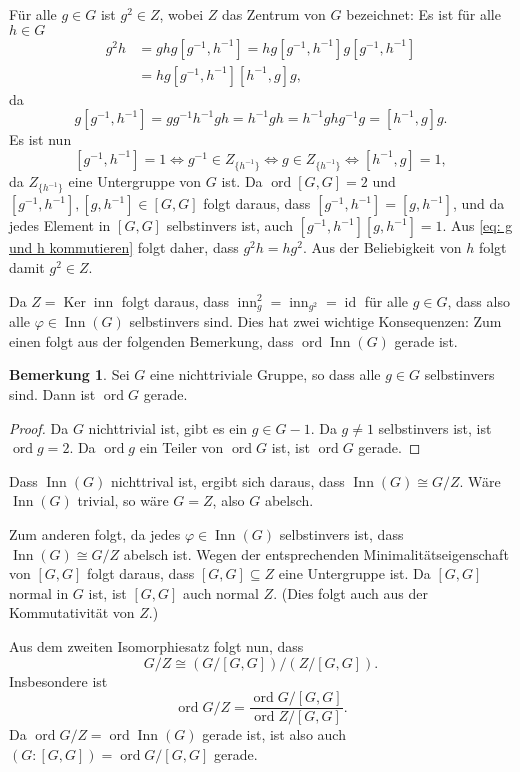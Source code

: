 \documentclass[a4paper,10pt]{article}
\theoremstyle{definition}
\newtheorem{bem}[beh]{Bemerkung}
\newcommand{\id}{\operatorname{id}}
\newcommand{\ord}{\operatorname{ord}}
\newcommand{\inn}{\operatorname{inn}}
\newcommand{\Ker}{\operatorname{Ker}}
\newcommand{\Inn}{\operatorname{Inn}}
\begin{document}
Für alle $g \in G$ ist $g^2 \in Z$, wobei $Z$ das Zentrum von $G$ bezeichnet: Es ist für alle $h \in G$
\begin{equation}\label{eq: g und h kommutieren}
 \begin{aligned}
  g^2 h
  &= g h g \left[g^{-1},h^{-1}\right]
  = h g \left[g^{-1},h^{-1}\right] g \left[g^{-1},h^{-1}\right] \\
  &= h g \left[g^{-1},h^{-1}\right] \left[h^{-1},g\right] g,
 \end{aligned}
\end{equation}
da
\[
 g \left[g^{-1},h^{-1}\right]
 = g g^{-1} h^{-1} g h = h^{-1} g h = h^{-1} g h g^{-1} g = \left[h^{-1},g\right] g.
\]
Es ist nun
\[
 \left[g^{-1},h^{-1}\right] = 1
 \Leftrightarrow g^{-1}  \in Z_{\{h^{-1}\}}
 \Leftrightarrow g \in Z_{\{h^{-1}\}}
 \Leftrightarrow \left[h^{-1},g\right] = 1,
\]
da $Z_{\{h^{-1}\}}$ eine Untergruppe von $G$ ist. Da $\ord [G,G] = 2$ und $\left[g^{-1},h^{-1}\right], \left[g,h^{-1}\right] \in [G,G]$ folgt daraus, dass $\left[g^{-1},h^{-1}\right] = \left[g,h^{-1}\right]$, und da jedes Element in $[G,G]$ selbstinvers ist, auch $\left[g^{-1},h^{-1}\right] \left[g,h^{-1}\right] = 1$. Aus \eqref{eq: g und h kommutieren} folgt daher, dass $g^2h = hg^2$. Aus der Beliebigkeit von $h$ folgt damit $g^2 \in Z$.

Da $Z = \Ker \inn$ folgt daraus, dass $\inn_g^2 = \inn_{g^2} = \id$ für alle $g \in G$, dass also alle $\varphi \in \Inn(G)$ selbstinvers sind. Dies hat zwei wichtige Konsequenzen: Zum einen folgt aus der folgenden Bemerkung, dass $\ord \Inn(G)$ gerade ist.

\begin{bem}
 Sei $G$ eine nichttriviale Gruppe, so dass alle $g \in G$ selbstinvers sind. Dann ist $\ord G$ gerade.
\end{bem}
\begin{proof}
 Da $G$ nichttrivial ist, gibt es ein $g \in G-1$. Da $g \neq 1$ selbstinvers ist, ist $\ord g = 2$. Da $\ord g$ ein Teiler von $\ord G$ ist, ist $\ord G$ gerade.
\end{proof}

Dass $\Inn(G)$ nichttrival ist, ergibt sich daraus, dass $\Inn(G) \cong G/Z$. Wäre $\Inn(G)$ trivial, so wäre $G = Z$, also $G$ abelsch.

Zum anderen folgt, da jedes $\varphi \in \Inn(G)$ selbstinvers ist, dass $\Inn(G) \cong G/Z$ abelsch ist. Wegen der entsprechenden Minimalitätseigenschaft von $[G,G]$ folgt daraus, dass $[G,G] \subseteq Z$ eine Untergruppe ist. Da $[G,G]$ normal in $G$ ist, ist $[G,G]$ auch normal $Z$. (Dies folgt auch aus der Kommutativität von $Z$.)

Aus dem zweiten Isomorphiesatz folgt nun, dass
\[
 G/Z \cong (G/[G,G])/(Z/[G,G]).
\]
Insbesondere ist
\[
 \ord G/Z = \frac{\ord G/[G,G]}{\ord Z/[G,G]}.
\]
Da $\ord G/Z = \ord \Inn(G)$ gerade ist, ist also auch $(G : [G,G]) = \ord G/[G,G]$ gerade.
\end{document}
